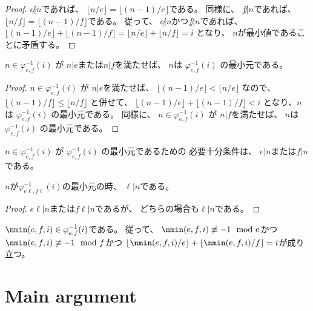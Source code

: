 \begin{proof}
$e \not | n$であれば、
$\lfloor n / e \rfloor = \lfloor (n-1) / e \rfloor$である。
同様に、
$f \not | n$であれば、
$\lfloor n / f \rfloor = \lfloor (n-1) / f \rfloor$である。
従って、
$e \not | n$かつ$f \not | n$であれば、
$
\lfloor (n-1) / e \rfloor + \lfloor (n-1) / f \rfloor
= \lfloor n / e \rfloor + \lfloor n / f \rfloor
= i
$
となり、
$n$が最小値であることに矛盾する。
\end{proof}

\begin{lemma}
\label{lm:dvd_min_φinv}
\leanok
$n \in \varphi_{e,f}^{-1}(i)$
が
$n | e$または$n | f$を満たせば、
$n$は
$\varphi_{e,f}^{-1}(i)$
の最小元である。
\end{lemma}

\begin{proof}
$n \in \varphi_{e,f}^{-1}(i)$
が
$n | e$を満たせば、
$
\lfloor (n-1) / e \rfloor < \lfloor n / e \rfloor
$
なので、
$
\lfloor (n-1) / f \rfloor \le \lfloor n / f \rfloor
$
と併せて、
$\lfloor (n-1) / e \rfloor + \lfloor (n-1) / f \rfloor < i$
となり、$n$は
$\varphi_{e,f}^{-1}(i)$
の最小元である。
同様に、
$n \in \varphi_{e,f}^{-1}(i)$
が
$n | f$を満たせば、
$n$は
$\varphi_{e,f}^{-1}(i)$
の最小元である。
\end{proof}

\begin{lemma}
$n \in \varphi_{e,f}^{-1}(i)$
が
$\varphi_{e,f}^{-1}(i)$
の最小元であるための
必要十分条件は、
$e | n$または$f | n$である。
\end{lemma}

\begin{lemma}
\label{lm:gcd_div_min_φinv}
\leanok
$n$が$\varphi_{e \ell, f \ell}^{-1}(i)$の最小元の時、
$\ell | n$である。
\end{lemma}

\begin{proof}
$e \ell| n$または$f \ell| n$であるが、
どちらの場合も$\ell | n$である。
\end{proof}

$\nmin(e,f,i) \in \varphi_{e,f}^{-1}(i)$である。
従って、
$\nmin(e,f,i) \not \equiv -1 \mod e$かつ
$\nmin(e,f,i) \not \equiv -1 \mod f$かつ
$\lfloor \nmin(e,f,i) / e \rfloor + \lfloor \nmin(e,f,i) / f \rfloor = i$が成り立つ。

\chapter{Main argument}

